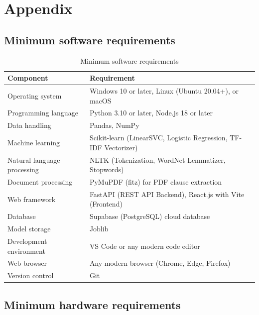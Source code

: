 \chapter{Appendix}
\label{ch:appendix}

\section{Minimum software requirements}
\label{sec:appendix_software}

\begin{table}[htbp]
\centering
\begin{tabular}{|p{4.5cm}|p{10.5cm}|}
\hline
Component & Requirement \\
\hline
Operating system & Windows 10 or later, Linux (Ubuntu 20.04+), or macOS \\
\hline
Programming language & Python 3.10 or later, Node.js 18 or later \\
\hline
Data handling & Pandas, NumPy \\
\hline
Machine learning & Scikit-learn (LinearSVC, Logistic Regression, TF-IDF Vectorizer) \\
\hline
Natural language processing & NLTK (Tokenization, WordNet Lemmatizer, Stopwords) \\
\hline
Document processing & PyMuPDF (fitz) for PDF clause extraction \\
\hline
Web framework & FastAPI (REST API Backend), React.js with Vite (Frontend) \\
\hline
Database & Supabase (PostgreSQL) cloud database \\
\hline
Model storage & Joblib \\
\hline
Development environment & VS Code or any modern code editor \\
\hline
Web browser & Any modern browser (Chrome, Edge, Firefox) \\
\hline
Version control & Git \\
\hline
\end{tabular}
\caption{Minimum software requirements}\label{tab:appendix_software}
\end{table}

\section{Minimum hardware requirements}
\label{sec:appendix_hardware}

